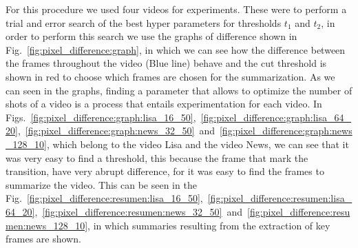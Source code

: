 \documentclass[journal]{IEEEtran}
\begin{document}
For this procedure we used four videos for experiments. These were to perform a trial and error search of the best hyper parameters for thresholds $t_1$ and $t_2$, in order to perform this search we use the graphs of difference shown in Fig.~\ref{fig:pixel_difference:graph}, in which we can see how the difference between the frames throughout the video (Blue line) behave and the cut threshold is shown in red to choose which frames are chosen for the summarization. As we can seen in the graphs, finding a parameter that allows to optimize the number of shots of a video is a process that entails experimentation for each video. In Figs.~\ref{fig:pixel_difference:graph:lisa_16_50},~\ref{fig:pixel_difference:graph:lisa_64_20},~\ref{fig:pixel_difference:graph:news_32_50}~and~\ref{fig:pixel_difference:graph:news_128_10}, which belong to the video Lisa and the video News, we can see that it was very easy to find a threshold, this because the frame that mark the transition, have very abrupt difference, for it was easy to find the frames to summarize the video. This can be seen in the Fig.~\ref{fig:pixel_difference:resumen:lisa_16_50},~\ref{fig:pixel_difference:resumen:lisa_64_20},~\ref{fig:pixel_difference:resumen:news_32_50}~and~\ref{fig:pixel_difference:resumen:news_128_10}, in which summaries resulting from the extraction of key frames are shown.
\end{document}
